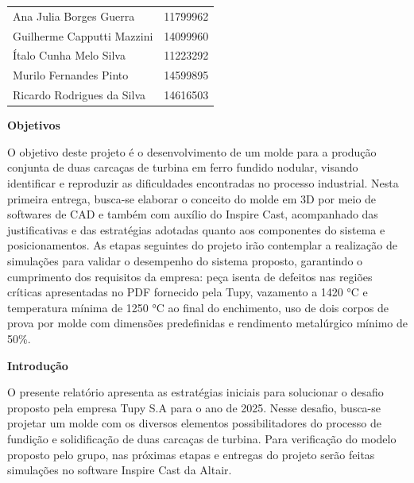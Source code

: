 \documentclass[12pt, a4]{article}
\begin{document}
\begin{titlepage}
\textbf{\disciplina}

\vspace{0.5cm}

\textbf{\prof}

\vspace{0.5cm}

\begin{flushright}
\begin{tabular}{l l}
    Ana Julia Borges Guerra & 11799962\\
    Guilherme Capputti Mazzini & 14099960\\
    Ítalo Cunha Melo Silva & 11223292\\
    Murilo Fernandes Pinto & 14599895\\
    Ricardo Rodrigues da Silva & 14616503
\end{tabular}
\end{flushright}

\vfill
\data

\end{titlepage}
\pagebreak

\begin{flushleft}
    \textbf{Objetivos}
\end{flushleft}

O objetivo deste projeto é o desenvolvimento de um molde para a produção conjunta de duas carcaças de turbina em ferro fundido nodular, visando identificar e reproduzir as dificuldades encontradas no processo industrial. Nesta primeira entrega, busca-se elaborar o conceito do molde em 3D por meio de softwares de CAD e também com auxílio do Inspire Cast, acompanhado das justificativas e das estratégias adotadas quanto aos componentes do sistema e posicionamentos. As etapas seguintes do projeto irão contemplar a realização de simulações para validar o desempenho do sistema proposto, garantindo o cumprimento dos requisitos da empresa: peça isenta de defeitos nas regiões críticas apresentadas no PDF fornecido pela Tupy, vazamento a 1420 °C e temperatura mínima de 1250 °C ao final do enchimento, uso de dois corpos de prova por molde com dimensões predefinidas e rendimento metalúrgico mínimo de 50\%.

\begin{flushleft}
    \textbf{Introdução}
\end{flushleft}

O presente relatório apresenta as estratégias iniciais para solucionar o desafio proposto pela empresa Tupy S.A para o ano de 2025. Nesse desafio, busca-se projetar um molde com os diversos elementos possibilitadores do processo de fundição e solidificação de duas carcaças de turbina. Para verificação do modelo proposto pelo grupo, nas próximas etapas e entregas do projeto serão feitas simulações no software Inspire Cast da Altair. 
\end{document}
